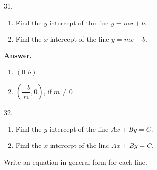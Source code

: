 \documentclass[10pt,]{book}
\theoremstyle{plain}
\theoremstyle{definition}
\theoremstyle{definition}
\theoremstyle{definition}
\theoremstyle{definition}
\numberwithin{equation}{part}
\begin{document}
\begin{exerciselist}
\begin{multicols}{2}
\begin{enumerate}[label=\alph*]
\end{enumerate}
\end{multicols}
\par\smallskip
\item[31.]\hypertarget{exercise-38}{}\leavevmode%
\begin{enumerate}[label=\alph*]
\item\hypertarget{li-227}{}Find the \(y\)-intercept of the line \(y = mx + b\).%
\item\hypertarget{li-228}{}Find the \(x\)-intercept of the line \(y = mx + b\).%
\end{enumerate}
%
\par\smallskip
\par\smallskip
\noindent\textbf{Answer.}\hypertarget{answer-23}{}\quad
\leavevmode%
\begin{enumerate}[label=\alph*]
\item\hypertarget{li-229}{}\((0, b)\)%
\item\hypertarget{li-230}{}\(\left(\dfrac{-b}{m},0\right)\), if \(m\ne 0\)%
\end{enumerate}
%
\item[32.]\hypertarget{exercise-39}{}\leavevmode%
\begin{enumerate}[label=\alph*]
\item\hypertarget{li-231}{}Find the \(y\)-intercept of the line \(Ax + By = C\).%
\item\hypertarget{li-232}{}Find the \(x\)-intercept of the line \(Ax + By = C\).%
\end{enumerate}
%
\par\smallskip
\end{exerciselist}
\hypertarget{exercisegroup-4}{}\par\noindent Write an equation in general form for each line.%
\end{document}
